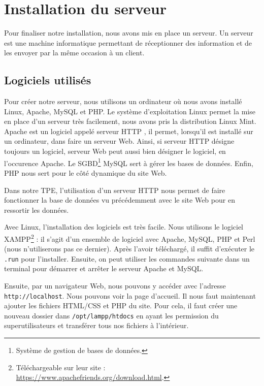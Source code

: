 \chapter{Installation du serveur}

Pour finaliser notre installation, nous avons mis en place un serveur. Un serveur est une machine informatique permettant de réceptionner des information et de les envoyer par la même occasion à un client.

\section{Logiciels utilisés}
\label{section:logiciels}

Pour créer notre serveur, nous utilisons un ordinateur où nous avons installé Linux, Apache, MySQL et PHP. Le système d'exploitation Linux permet la mise en place d'un serveur très facilement, nous avons pris la distribution Linux Mint. Apache est un logiciel appelé \og serveur HTTP \fg, il permet, lorsqu'il est installé sur un ordinateur, dans faire un serveur Web. Ainsi, si \og serveur HTTP \fg{} désigne toujours un logiciel, \og serveur Web \fg{} peut aussi bien désigner le logiciel, en l'occurence Apache. Le SGBD\footnote{Système de gestion de bases de données.} MySQL sert à gérer les bases de données. Enfin, PHP nous sert pour le côté dynamique du site Web.

Dans notre TPE, l'utilisation d'un serveur HTTP nous permet de faire fonctionner la base de données vu précédemment avec le site Web pour en ressortir les données.

\Espace

Avec Linux, l'installation des logiciels est très facile. Nous utilisons le logiciel XAMPP\footnote{Téléchargeable sur leur site : \url{https://www.apachefriends.org/download.html}.} : il s'agit d'un ensemble de logiciel avec Apache, MySQL, PHP et Perl (nous n'utiliserons pas ce dernier). Après l'avoir téléchargé, il suffit d'exécuter le \verb-.run- pour l'installer. Ensuite, on peut utiliser les commandes suivante dans un terminal pour démarrer et arrêter le serveur Apache et MySQL.


Ensuite, par un navigateur Web, nous pouvons y accéder avec l'adresse \verb-http://localhost-. Nous pouvons voir la page d'accueil. Il nous faut maintenant ajouter les fichiers HTML/CSS et PHP du site. Pour cela, il faut créer une nouveau dossier dans \verb-/opt/lampp/htdocs- en ayant les permission du superutilisateurs et transférer tous nos fichiers à l'intérieur.

